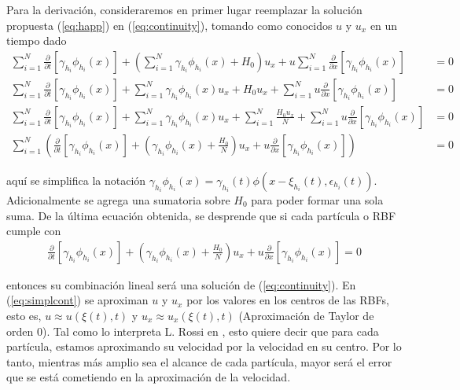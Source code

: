\documentclass[spanish]{article}
\begin{document}
     Para la derivación, consideraremos en primer lugar reemplazar la solución propuesta (\ref{eq:happ}) en (\ref{eq:continuity}), tomando como conocidos $u$ y $u_x$ en un tiempo dado
     \begin{align*}
     \sum_{i=1}^{N} \frac{\partial}{\partial t}[\gamma_{h_i}\phi_{h_i}(x)] + \left(\sum_{i=1}^{N} \gamma_{h_i} \phi_{h_i}(x) + H_0\right) u_x + u \sum_{i=1}^N \frac{\partial}{\partial x}[\gamma_{h_i}\phi_{h_i}(x)] & = 0 \\
     \sum_{i=1}^{N} \frac{\partial}{\partial t}[\gamma_{h_i}\phi_{h_i}(x)] + \sum_{i=1}^{N} \gamma_{h_i} \phi_{h_i}(x)u_x + H_0 u_x +  \sum_{i=1}^N u \frac{\partial}{\partial x}[\gamma_{h_i}\phi_{h_i}(x)] & = 0 \\
     \sum_{i=1}^{N} \frac{\partial}{\partial t}[\gamma_{h_i}\phi_{h_i}(x)] + \sum_{i=1}^{N} \gamma_{h_i} \phi_{h_i}(x)u_x + \sum_{i=1}^{N} \frac{H_0 u_x}{N} +  \sum_{i=1}^N u \frac{\partial}{\partial x}[\gamma_{h_i}\phi_{h_i}(x)] & = 0 \\
     \sum_{i=1}^N \left(\frac{\partial}{\partial t}[\gamma_{h_i}\phi_{h_i}(x)] + \left(\gamma_{h_i} \phi_{h_i}(x) + \frac{H_0}{N}\right)u_x + u \frac{\partial}{\partial x}[\gamma_{h_i}\phi_{h_i}(x)]\right) & = 0
     \end{align*}

     \noindent aquí se simplifica la notación $\displaystyle \gamma_{h_i}\phi_{h_i}(x) = \gamma_{h_i}(t)\phi(x-\xi_{h_i}(t),\epsilon_{h_i}(t))$. Adicionalmente se agrega una sumatoria sobre $H_0$ para poder formar una sola suma. De la última ecuación obtenida, se desprende que si cada partícula o RBF cumple con
     \begin{align}
          \frac{\partial}{\partial t}[\gamma_{h_i}\phi_{h_i}(x)] + \left(\gamma_{h_i} \phi_{h_i}(x) + \frac{H_0}{N}\right)u_x + u \frac{\partial}{\partial x}[\gamma_{h_i}\phi_{h_i}(x)] = 0
          \label{eq:simplcont}
      \end{align}

      \noindent entonces su combinación lineal será una solución de (\ref{eq:continuity}). En (\ref{eq:simplcont}) se aproximan $u$ y $u_x$ por los valores en los centros de las RBFs, esto es, $u \approx u(\xi(t),t)$ y $u_x \approx u_x(\xi(t),t)$ (Aproximación de Taylor de orden $0$). Tal como lo interpreta L. Rossi en \cite{rossi}, esto quiere decir que para cada partícula, estamos aproximando su velocidad por la velocidad en su centro. Por lo tanto, mientras más amplio sea el alcance de cada partícula, mayor será el error que se está cometiendo en la aproximación de la velocidad.
\end{document}
